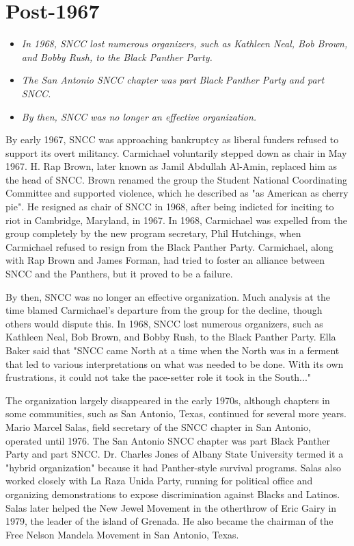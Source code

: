 \section{Post-1967}\label{post-1967}

\begin{itemize}
\item
  \emph{In 1968, SNCC lost numerous organizers, such as Kathleen Neal,
  Bob Brown, and Bobby Rush, to the Black Panther Party.}
\item
  \emph{The San Antonio SNCC chapter was part Black Panther Party and
  part SNCC.}
\item
  \emph{By then, SNCC was no longer an effective organization.}
\end{itemize}

By early 1967, SNCC was approaching bankruptcy as liberal funders
refused to support its overt militancy. Carmichael voluntarily stepped
down as chair in May 1967. H. Rap Brown, later known as Jamil Abdullah
Al-Amin, replaced him as the head of SNCC. Brown renamed the group the
Student National Coordinating Committee and supported violence, which he
described as "as American as cherry pie". He resigned as chair of SNCC
in 1968, after being indicted for inciting to riot in Cambridge,
Maryland, in 1967. In 1968, Carmichael was expelled from the group
completely by the new program secretary, Phil Hutchings, when Carmichael
refused to resign from the Black Panther Party. Carmichael, along with
Rap Brown and James Forman, had tried to foster an alliance between SNCC
and the Panthers, but it proved to be a failure.

By then, SNCC was no longer an effective organization. Much analysis at
the time blamed Carmichael's departure from the group for the decline,
though others would dispute this. In 1968, SNCC lost numerous
organizers, such as Kathleen Neal, Bob Brown, and Bobby Rush, to the
Black Panther Party. Ella Baker said that "SNCC came North at a time
when the North was in a ferment that led to various interpretations on
what was needed to be done. With its own frustrations, it could not take
the pace-setter role it took in the South..."

The organization largely disappeared in the early 1970s, although
chapters in some communities, such as San Antonio, Texas, continued for
several more years. Mario Marcel Salas, field secretary of the SNCC
chapter in San Antonio, operated until 1976. The San Antonio SNCC
chapter was part Black Panther Party and part SNCC. Dr. Charles Jones of
Albany State University termed it a "hybrid organization" because it had
Panther-style survival programs. Salas also worked closely with La Raza
Unida Party, running for political office and organizing demonstrations
to expose discrimination against Blacks and Latinos. Salas later helped
the New Jewel Movement in the otherthrow of Eric Gairy in 1979, the
leader of the island of Grenada. He also became the chairman of the Free
Nelson Mandela Movement in San Antonio, Texas.

